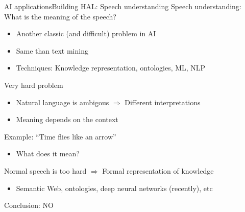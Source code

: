 \documentclass[10pt,compress]{beamer} %
\begin{document}
\begin{frame}{AI applications}{Building HAL: Speech understanding}
	Speech understanding: What is the meaning of the speech?
	\begin{itemize}
		\item Another classic (and difficult) problem in AI
		\item Same than text mining
		\item Techniques: Knowledge representation, ontologies, ML, NLP
	\end{itemize}
	Very hard problem
	\begin{itemize}
		\item Natural language is ambigous $\Rightarrow$ Different interpretations 
		\item Meaning depends on the context
	\end{itemize}
	Example: ``Time flies like an arrow''
	\begin{itemize}
		\item What does it mean?
	\end{itemize}
	Normal speech is too hard $\Rightarrow$ Formal representation of knowledge
	\begin{itemize}
		\item Semantic Web, ontologies, deep neural networks (recently), etc
	\end{itemize}
	Conclusion: NO
\end{frame}
\end{document}
